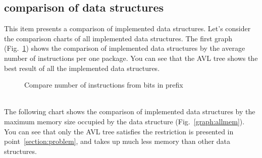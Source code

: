 \documentclass[conference]{IEEEtran}
\begin{document}
        \subsection{comparison of data structures}
            This item presents a comparison of implemented data structures. 
            Let's consider the comparison charts of all implemented data structures.
            The first graph (Fig.~\ref{graph:allinst}) shows the comparison of 
            implemented data structures by the average number of instructions per one package. 
            You can see that the AVL tree shows the best result of all the implemented data structures.
            \\
            \begin{figure}[ht]
                \centering
                \captionsetup{justification=centering}
                \caption{Compare number of instructions from bits in prefix}
                \label{graph:allinst}
            \end{figure}
            \\
            The following chart shows the comparison of implemented data structures 
            by the maximum memory size occupied by the data structure (Fig.~\ref{graph:allmem}). 
            You can see that only the AVL tree satisfies
            the restriction is presented in point~\ref{section:problem}, 
            and takes up much less memory than other data structures.
            \\
\end{document}
